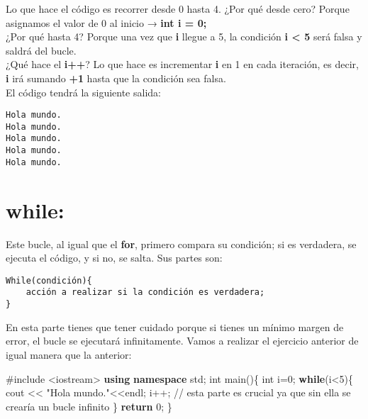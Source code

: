 \documentclass[
  11pt,
  a4paper,
  DIV=11,
  numbers=noendperiod]{scrreprt}
\newenvironment{Shaded}{\begin{snugshade}}{\end{snugshade}}
\newcommand{\CommentTok}[1]{\textcolor[rgb]{0.37,0.37,0.37}{#1}}
\newcommand{\ControlFlowTok}[1]{\textcolor[rgb]{0.00,0.23,0.31}{\textbf{#1}}}
\newcommand{\DataTypeTok}[1]{\textcolor[rgb]{0.68,0.00,0.00}{#1}}
\newcommand{\DecValTok}[1]{\textcolor[rgb]{0.68,0.00,0.00}{#1}}
\newcommand{\ImportTok}[1]{\textcolor[rgb]{0.00,0.46,0.62}{#1}}
\newcommand{\KeywordTok}[1]{\textcolor[rgb]{0.00,0.23,0.31}{\textbf{#1}}}
\newcommand{\NormalTok}[1]{\textcolor[rgb]{0.00,0.23,0.31}{#1}}
\newcommand{\OperatorTok}[1]{\textcolor[rgb]{0.37,0.37,0.37}{#1}}
\newcommand{\PreprocessorTok}[1]{\textcolor[rgb]{0.68,0.00,0.00}{#1}}
\newcommand{\StringTok}[1]{\textcolor[rgb]{0.13,0.47,0.30}{#1}}
\begin{document}
Lo que hace el código es recorrer desde 0 hasta 4. ¿Por qué desde cero?
Porque asignamos el valor de 0 al inicio → \textbf{int i = 0;}\\
¿Por qué hasta 4? Porque una vez que \textbf{i} llegue a 5, la condición
\textbf{i \textless{} 5} será falsa y saldrá del bucle.\\
¿Qué hace el \textbf{i++}? Lo que hace es incrementar \textbf{i} en 1 en
cada iteración, es decir, \textbf{i} irá sumando \textbf{+1} hasta que
la condición sea falsa.\\
El código tendrá la siguiente salida:

\begin{tcolorbox}[custombox]
\begin{verbatim}
Hola mundo. 
Hola mundo. 
Hola mundo. 
Hola mundo. 
Hola mundo.
\end{verbatim}
\end{tcolorbox}

\section{while:}\label{while}

Este bucle, al igual que el \textbf{for}, primero compara su condición;
si es verdadera, se ejecuta el código, y si no, se salta. Sus partes
son:

\begin{tcolorbox}[custombox]
\begin{verbatim}
While(condición){ 
    acción a realizar si la condición es verdadera;     
}
\end{verbatim}
\end{tcolorbox}

En esta parte tienes que tener cuidado porque si tienes un mínimo margen
de error, el bucle se ejecutará infinitamente. Vamos a realizar el
ejercicio anterior de igual manera que la anterior:

\begin{Shaded}
\begin{Highlighting}[]
\PreprocessorTok{\#include }\ImportTok{\textless{}iostream\textgreater{}}
\KeywordTok{using} \KeywordTok{namespace}\NormalTok{ std}\OperatorTok{;}
\DataTypeTok{int}\NormalTok{ main}\OperatorTok{()\{}
    \DataTypeTok{int}\NormalTok{ i}\OperatorTok{=}\DecValTok{0}\OperatorTok{;}
    \ControlFlowTok{while}\OperatorTok{(}\NormalTok{i}\OperatorTok{\textless{}}\DecValTok{5}\OperatorTok{)\{}
\NormalTok{        cout }\OperatorTok{\textless{}\textless{}} \StringTok{"Hola mundo."}\OperatorTok{\textless{}\textless{}}\NormalTok{endl}\OperatorTok{;}
\NormalTok{        i}\OperatorTok{++;} \CommentTok{// esta parte es crucial ya que sin ella se crearía un bucle infinito}
    \OperatorTok{\}}
    \ControlFlowTok{return} \DecValTok{0}\OperatorTok{;}
\OperatorTok{\}}
\end{Highlighting}
\end{Shaded}
\end{document}
